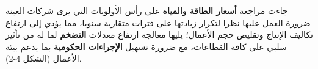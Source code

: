 جاءت مراجعة \textbf{أسعار الطاقة والمياه} على رأس الأولويات التي يرى شركات العينة ضرورة العمل عليها نظرا لتكرار زيادتها على فترات متقاربة سنويا، مما يؤدي إلى ارتفاع تكاليف الإنتاج وتقليص حجم الأعمال؛ يليها معالجة ارتفاع معدلات \textbf{التضخم} لما له من تأثير سلبي على كافة القطاعات، مع ضرورة تسهيل \textbf{الإجراءات الحكومية} بما يدعم بيئة الأعمال (الشكل 4-2).
